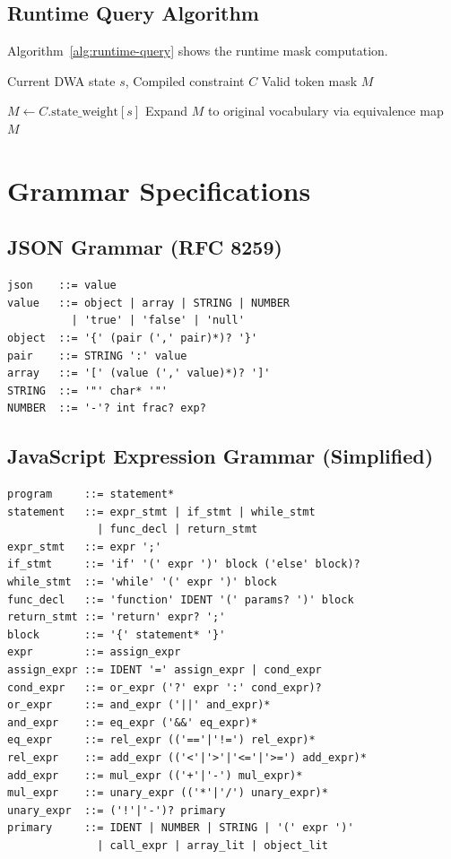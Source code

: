 \documentclass[11pt,a4paper]{article}
\theoremstyle{plain}
\theoremstyle{definition}
\theoremstyle{remark}
\begin{document}
\subsection{Runtime Query Algorithm}

Algorithm~\ref{alg:runtime-query} shows the runtime mask computation.

\begin{algorithm}[h]
\caption{Token Mask Query}
\label{alg:runtime-query}
\begin{algorithmic}[1]
\Require Current DWA state $s$, Compiled constraint $C$
\Ensure Valid token mask $M$

\State $M \gets C.\text{state\_weight}[s]$ 
\State Expand $M$ to original vocabulary via equivalence map
\Return $M$
\end{algorithmic}
\end{algorithm}

\section{Grammar Specifications}
\label{app:grammars}

\subsection{JSON Grammar (RFC 8259)}

\begin{verbatim}
json    ::= value
value   ::= object | array | STRING | NUMBER 
          | 'true' | 'false' | 'null'
object  ::= '{' (pair (',' pair)*)? '}'
pair    ::= STRING ':' value
array   ::= '[' (value (',' value)*)? ']'
STRING  ::= '"' char* '"'
NUMBER  ::= '-'? int frac? exp?
\end{verbatim}

\subsection{JavaScript Expression Grammar (Simplified)}

\begin{verbatim}
program     ::= statement*
statement   ::= expr_stmt | if_stmt | while_stmt 
              | func_decl | return_stmt
expr_stmt   ::= expr ';'
if_stmt     ::= 'if' '(' expr ')' block ('else' block)?
while_stmt  ::= 'while' '(' expr ')' block
func_decl   ::= 'function' IDENT '(' params? ')' block
return_stmt ::= 'return' expr? ';'
block       ::= '{' statement* '}'
expr        ::= assign_expr
assign_expr ::= IDENT '=' assign_expr | cond_expr
cond_expr   ::= or_expr ('?' expr ':' cond_expr)?
or_expr     ::= and_expr ('||' and_expr)*
and_expr    ::= eq_expr ('&&' eq_expr)*
eq_expr     ::= rel_expr (('=='|'!=') rel_expr)*
rel_expr    ::= add_expr (('<'|'>'|'<='|'>=') add_expr)*
add_expr    ::= mul_expr (('+'|'-') mul_expr)*
mul_expr    ::= unary_expr (('*'|'/') unary_expr)*
unary_expr  ::= ('!'|'-')? primary
primary     ::= IDENT | NUMBER | STRING | '(' expr ')' 
              | call_expr | array_lit | object_lit
\end{verbatim}
\end{document}
